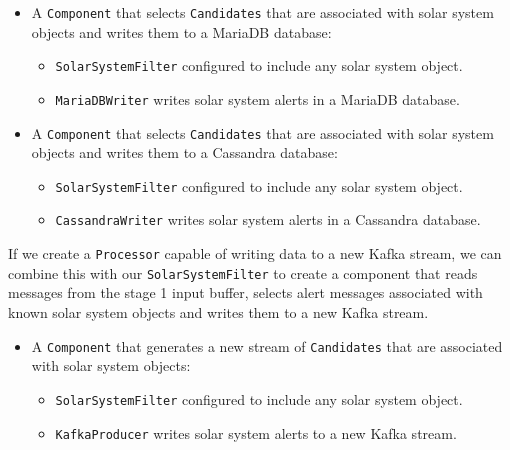 \documentclass{article}
\newcommand{\kafka} {Kafka\xspace}
\newcommand{\cassandra} {Cassandra\xspace}
\newcommand{\mariadb} {MariaDB\xspace}
\newcommand{\stageone} {stage 1\xspace}
\begin{document}
\begin{itemize}
    \item A \texttt{Component} that selects \texttt{Candidates} that are associated with solar system objects and writes them to a \mariadb database:
    \begin{itemize}
        \item \texttt{SolarSystemFilter} configured to include any solar system object.
    \end{itemize}
    \begin{itemize}
        \item \texttt{MariaDBWriter} writes solar system alerts in a \mariadb database.
    \end{itemize}
\end{itemize}

\begin{itemize}
    \item A \texttt{Component} that selects \texttt{Candidates} that are associated with solar system objects and writes them to a \cassandra database:
    \begin{itemize}
        \item \texttt{SolarSystemFilter} configured to include any solar system object.
    \end{itemize}
    \begin{itemize}
        \item \texttt{CassandraWriter} writes solar system alerts in a \cassandra database.
    \end{itemize}
\end{itemize}

If we create a \texttt{Processor} capable of writing data to a new \kafka stream, we can combine this with our \texttt{SolarSystemFilter} to create a component that reads messages from the \stageone input buffer, selects alert messages associated with known solar system objects and writes them to a new \kafka stream.

\begin{itemize}
    \item A \texttt{Component} that generates a new stream of \texttt{Candidates} that are associated with solar system objects:
    \begin{itemize}
        \item \texttt{SolarSystemFilter} configured to include any solar system object.
    \end{itemize}
    \begin{itemize}
        \item \texttt{KafkaProducer} writes solar system alerts to a new \kafka stream.
    \end{itemize}
\end{itemize}
\end{document}
